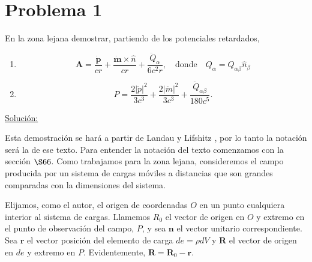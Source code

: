\documentclass[a4paper,11pt]{article}
\numberwithin{equation}{section}
\renewcommand{\thefootnote}{\fnsymbol{footnote}}
\begin{document}

\fancyhead[R]{\thepage}

\setcounter{footnote}{0}
\renewcommand*{\thefootnote}{\arabic{footnote}}


\section{Problema 1}

En la zona lejana demostrar, partiendo de los potenciales retardados, 

\begin{enumerate}[label=\textbf{(\alph*)}]
 \item 
 
 $$
 \mathbf{A} = \frac{\dot{\mathbf{p}}}{cr} + \frac{\dot{\mathbf{m}} \times 
 \hat{n}}{cr} + \frac{\ddot{Q}_{\alpha}}{6c^2r}, \quad \text{donde} \quad
 Q_\alpha = Q_{\alpha\beta} \hat{n}_\beta
 $$
 
 \item 
 
 $$
 P = \frac{2|\ddot{p}|^2}{3c^3} + \frac{2|\ddot{m}|^2}{3c^3} +
 \frac{\ddot{Q}_{\alpha\beta}}{180c^5}.
 $$
\end{enumerate}

\underline{Solución:} \vspace{.3cm}

Esta demostración se hará a partir de Landau y Lifshitz \cite{landau}, por lo 
tanto la notación será la de ese texto. Para entender la notación del texto 
comenzamos con la sección $\S 66$. Como trabajamos para la zona lejana, consideremos 
el campo producida por un sistema de cargas móviles a distancias que son grandes 
comparadas con la dimensiones del sistema. 

\vspace{.3cm}

Elijamos, como el autor, el origen de coordenadas $O$ en un punto cualquiera interior 
al sistema de cargas. Llamemos $R_0$ el vector de origen en $O$ y extremo en el 
punto de observación del campo, $P$, y sea $\mathbf{n}$ el vector unitario 
correspondiente. Sea $\mathbf{r}$ el vector posición del elemento de carga 
$de = \rho dV$ y $\mathbf{R}$ el vector de origen en $de$ y extremo en $P$. 
Evidentemente, $\mathbf{R} = \mathbf{R}_0 - \mathbf{r}$. 
\end{document}
